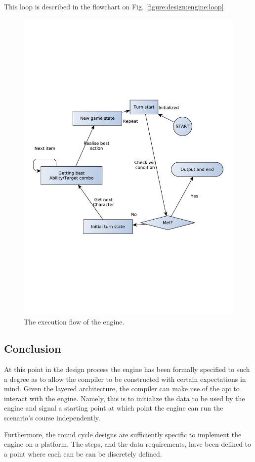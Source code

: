 This loop is described in the flowchart on Fig. \vref{figure:design:engine:loop}

\begin{figure}[h]
\centering
\includegraphics[scale=0.5, clip=true, trim=1cm 8cm 1cm 8cm]{img/engine_exec_loop}
\caption{\label{figure:design:engine:loop}The execution flow of the engine.}
\end{figure}

\subsection*{Conclusion}
At this point in the design process the engine has been formally specified to such a degree as to allow the compiler to be constructed with certain expectations in mind. Given the layered architecture, the compiler can make use of the \ac{api} to interact with the engine. Namely, this is to initialize the data to be used by the engine and signal a starting point at which point the engine can run the scenario's course independently.

Furthermore, the round cycle designs are sufficiently specific to implement the engine on a platform. The steps, and the data requirements, have been defined to a point where each can be can be discretely defined.